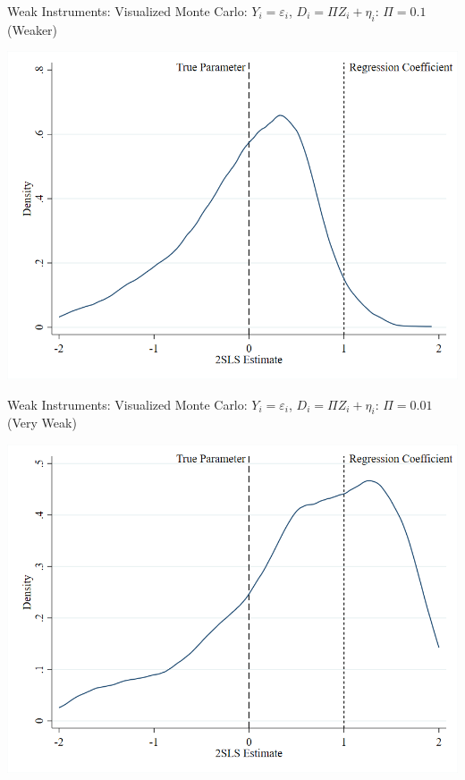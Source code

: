 \documentclass{beamer}
\begin{document}
\begin{frame}{Weak Instruments: Visualized}
\vspace{-0.2cm}
Monte Carlo: $Y_i=\varepsilon_i$, $D_i=\Pi Z_i+\eta_i$: $\Pi=0.1$ (Weaker)
\begin{center}
\includegraphics[scale=0.35]{./lecture_includes/medpi.png}
\end{center}

\end{frame}

\begin{frame}{Weak Instruments: Visualized}
\vspace{-0.2cm}
Monte Carlo: $Y_i=\varepsilon_i$, $D_i=\Pi Z_i+\eta_i$: $\Pi=0.01$ (Very Weak)
\begin{center}
\includegraphics[scale=0.35]{./lecture_includes/weakpi.png}
\end{center}

\end{frame}
\end{document}
